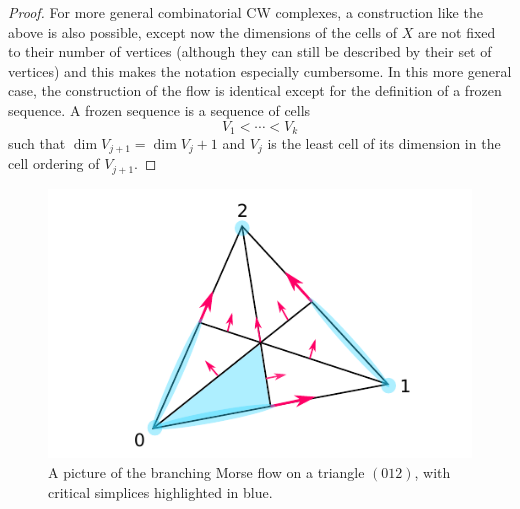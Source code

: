 \documentclass{article}
\theoremstyle{definition}
\begin{document}
\begin{proof}
For more general combinatorial CW complexes, a construction like the above is also possible, except now the dimensions of the cells of $X$ are not fixed to their number of vertices (although they can still be described by their set of vertices) and this makes the notation especially cumbersome. In this more general case, the construction of the flow is identical except for the definition of a frozen sequence. A frozen sequence is a sequence of cells
\[V_1 < \cdots < V_k\]
such that $\dim V_{j+1} = \dim V_j + 1$ and $V_j$ is the least cell of its dimension in the cell ordering of $V_{j+1}$.
\end{proof}




\begin{figure}
    \centering
    \includegraphics{barycentric-morse-flow.pdf}
    \caption{A picture of the branching Morse flow on a triangle $(012)$, with critical simplices highlighted in blue.}
    \label{fig:morse-flow}
\end{figure}

\end{document}
